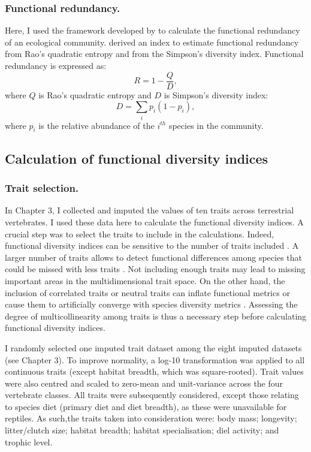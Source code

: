 \subsubsection{Functional redundancy.}
Here, I used the framework developed by \citet{Ricotta2016} to calculate the functional redundancy of an ecological community. \citet{Ricotta2016} derived an index to estimate functional redundancy from Rao's quadratic entropy and from the Simpson's diversity index. Functional redundancy is expressed as:
\begin{equation}
R=1-\frac{Q}{D},
\label{eqFRed}
\end{equation} 
where $Q$ is Rao's quadratic entropy and $D$ is Simpson's diversity index:
\begin{equation}
D=\sum_{i}p_{i}(1-p_{i}),
\end{equation} 
where $p_{i}$ is the relative abundance of the $i^{th}$ species in the community.

\subsection{Calculation of functional diversity indices}

\subsubsection{Trait selection.}
In Chapter 3, I collected and imputed the values of ten traits across terrestrial vertebrates. I used these data here to calculate the functional diversity indices. A crucial step was to select the traits to include in the calculations. Indeed, functional diversity indices can be sensitive to the number of traits included \citep{Mouillot2014, Cadotte2011}. A larger number of traits allows to detect functional differences among species that could be missed with less traits \citep{Petchey2002}. Not including enough traits may lead to missing important areas in the multidimensional trait space. On the other hand, the inclusion of correlated traits or neutral traits can inflate functional metrics or cause them to artificially converge with species diversity metrics \citep{Cadotte2011, Naeem2003}. Assessing the degree of multicollinearity among traits is thus a necessary step before calculating functional diversity indices. 

I randomly selected one imputed trait dataset among the eight imputed datasets (see Chapter 3). To improve normality, a log-10 transformation was applied to all continuous traits (except habitat breadth, which was square-rooted). Trait values were also centred and scaled to zero-mean and unit-variance across the four vertebrate classes. All traits were subsequently considered, except those relating to species diet (primary diet and diet breadth), as these were unavailable for reptiles. As such,the traits taken into consideration were: body mass; longevity; litter/clutch size; habitat breadth; habitat specialisation; diel activity; and trophic level.

